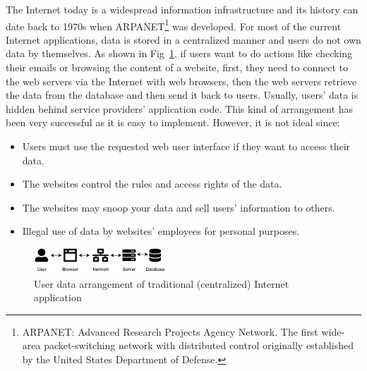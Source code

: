 The Internet today is a widespread information infrastructure and its history can date back to 1970s when ARPANET\footnote{ARPANET: Advanced Research Projects Agency Network.
    The first wide-area packet-switching network with distributed control originally established by the United States Department of Defense.} was developed.
For most of the current Internet applications, data is stored in a centralized manner and users do not own data by themselves. As shown in Fig~\ref{fig:traditional_internet},
if users want to do actions like checking their emails or browsing the content of a website, first, they need to connect to the web servers via the Internet with web browsers, then the web servers retrieve the data from the database and then send it back to users.
Usually, users' data is hidden behind service providers' application code. This kind of arrangement has been very successful as it is easy to implement. However, it is not ideal since:
\begin{itemize}
    \item Users must use the requested web user interface if they want to access their data.
    \item The websites control the rules and access rights of the data.
    \item The websites may snoop your data and sell users' information to others.
    \item Illegal use of data by websites' employees for personal purposes.
\end{itemize}

\begin{figure}[h]
    \includegraphics[width=0.45\textwidth,trim={-1cm 0 0.25cm 0},clip]{figs/traditional_internet.pdf}
    \caption{User data arrangement of traditional (centralized) Internet application}
    \label{fig:traditional_internet}
\end{figure}

